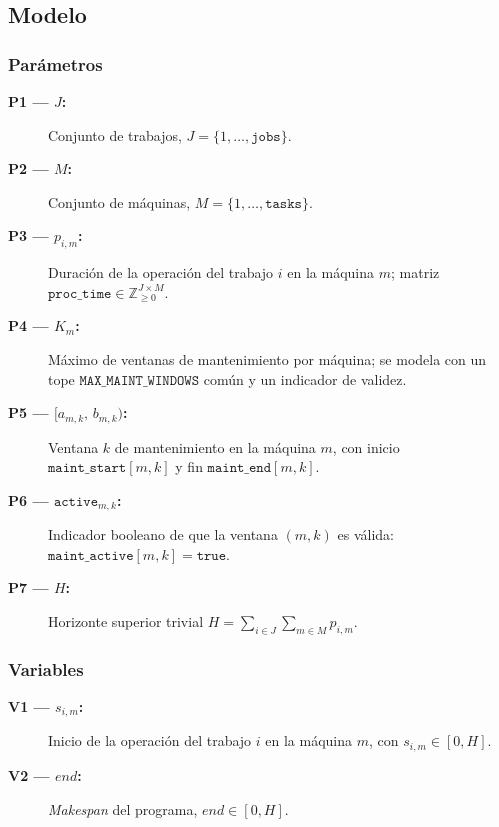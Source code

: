 
\subsection{Modelo}\label{sec:01-jobshop_mantenimiento-modelo}

\subsubsection*{Parámetros}
\begin{description}
  \item[\textbf{P1 — \(J\):}] Conjunto de trabajos, \(J=\{1,\dots,\texttt{jobs}\}\).
  \item[\textbf{P2 — \(M\):}] Conjunto de máquinas, \(M=\{1,\dots,\texttt{tasks}\}\).
  \item[\textbf{P3 — \(p_{i,m}\):}] Duración de la operación del trabajo \(i\) en la máquina \(m\); matriz \(\texttt{proc\_time}\in\mathbb{Z}_{\ge 0}^{J\times M}\).
  \item[\textbf{P4 — \(K_m\):}] Máximo de ventanas de mantenimiento por máquina; se modela con un tope \(\texttt{MAX\_MAINT\_WINDOWS}\) común y un indicador de validez.
  \item[\textbf{P5 — \([a_{m,k},\,b_{m,k})\):}] Ventana \(k\) de mantenimiento en la máquina \(m\), con inicio \(\texttt{maint\_start}[m,k]\) y fin \(\texttt{maint\_end}[m,k]\).
  \item[\textbf{P6 — \(\texttt{active}_{m,k}\):}] Indicador booleano de que la ventana \((m,k)\) es válida: \(\texttt{maint\_active}[m,k]=\texttt{true}\).
  \item[\textbf{P7 — \(H\):}] Horizonte superior trivial \(H=\sum_{i\in J}\sum_{m\in M} p_{i,m}\).
\end{description}

\subsubsection*{Variables}
\begin{description}
  \item[\textbf{V1 — \(s_{i,m}\):}] Inicio de la operación del trabajo \(i\) en la máquina \(m\), con \(s_{i,m}\in[0,H]\).
  \item[\textbf{V2 — \(\textit{end}\):}] \emph{Makespan} del programa, \(\textit{end}\in[0,H]\).
\end{description}

